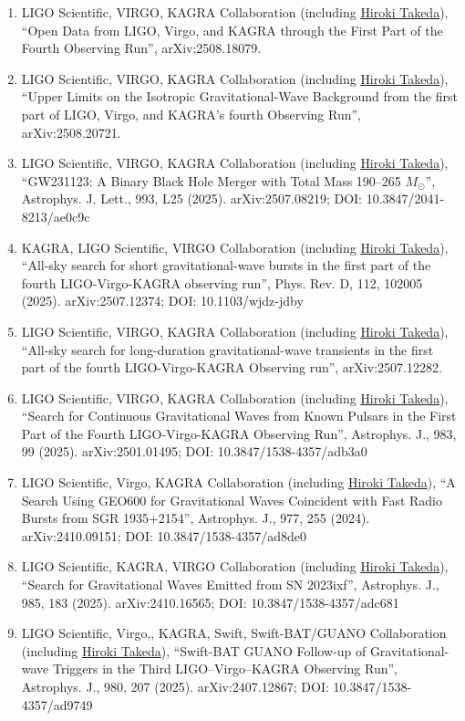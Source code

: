 \documentclass[uplatex, 11pt]{jsarticle}
\begin{document}
\begin{enumerate}
\item LIGO Scientific, VIRGO, KAGRA Collaboration (including \uline{Hiroki Takeda}), “Open Data from LIGO, Virgo, and KAGRA through the First Part of the Fourth Observing Run”, arXiv:2508.18079.
\item LIGO Scientific, VIRGO, KAGRA Collaboration (including \uline{Hiroki Takeda}), “Upper Limits on the Isotropic Gravitational-Wave Background from the first part of LIGO, Virgo, and KAGRA's fourth Observing Run”, arXiv:2508.20721.
\item LIGO Scientific, VIRGO, KAGRA Collaboration (including \uline{Hiroki Takeda}), “GW231123: A Binary Black Hole Merger with Total Mass 190--265 $M_{\odot}$”, Astrophys. J. Lett., 993, L25 (2025). arXiv:2507.08219; DOI: 10.3847/2041-8213/ae0c9c
\item KAGRA, LIGO Scientific, VIRGO Collaboration (including \uline{Hiroki Takeda}), “All-sky search for short gravitational-wave bursts in the first part of the fourth LIGO-Virgo-KAGRA observing run”, Phys. Rev. D, 112, 102005 (2025). arXiv:2507.12374; DOI: 10.1103/wjdz-jdby
\item LIGO Scientific, VIRGO, KAGRA Collaboration (including \uline{Hiroki Takeda}), “All-sky search for long-duration gravitational-wave transients in the first part of the fourth LIGO-Virgo-KAGRA Observing run”, arXiv:2507.12282.
\item LIGO Scientific, VIRGO, KAGRA Collaboration (including \uline{Hiroki Takeda}), “Search for Continuous Gravitational Waves from Known Pulsars in the First Part of the Fourth LIGO-Virgo-KAGRA Observing Run”, Astrophys. J., 983, 99 (2025). arXiv:2501.01495; DOI: 10.3847/1538-4357/adb3a0
\item LIGO Scientific, Virgo, KAGRA Collaboration (including \uline{Hiroki Takeda}), “A Search Using GEO600 for Gravitational Waves Coincident with Fast Radio Bursts from SGR 1935+2154”, Astrophys. J., 977, 255 (2024). arXiv:2410.09151; DOI: 10.3847/1538-4357/ad8de0
\item LIGO Scientific, KAGRA, VIRGO Collaboration (including \uline{Hiroki Takeda}), “Search for Gravitational Waves Emitted from SN 2023ixf”, Astrophys. J., 985, 183 (2025). arXiv:2410.16565; DOI: 10.3847/1538-4357/adc681
\item LIGO Scientific, Virgo,, KAGRA, Swift, Swift-BAT/GUANO Collaboration (including \uline{Hiroki Takeda}), “Swift-BAT GUANO Follow-up of Gravitational-wave Triggers in the Third LIGO--Virgo--KAGRA Observing Run”, Astrophys. J., 980, 207 (2025). arXiv:2407.12867; DOI: 10.3847/1538-4357/ad9749

\end{enumerate}
\end{document}
